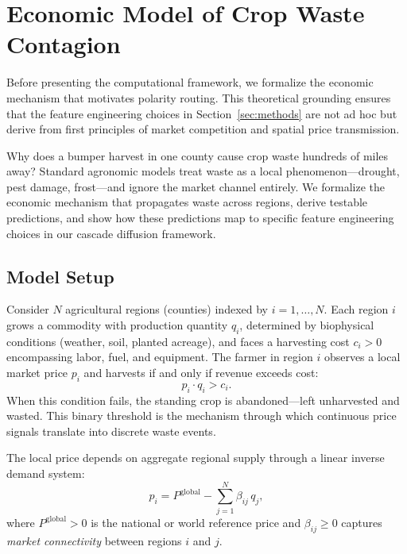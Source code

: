 \documentclass[preprint,12pt,authoryear]{elsarticle}
\begin{document}
\section{Economic Model of Crop Waste Contagion}
\label{sec:economic_model}

Before presenting the computational framework, we formalize the economic mechanism that motivates polarity routing. This theoretical grounding ensures that the feature engineering choices in Section~\ref{sec:methods} are not ad hoc but derive from first principles of market competition and spatial price transmission.

Why does a bumper harvest in one county cause crop waste hundreds of miles away?
Standard agronomic models treat waste as a local phenomenon---drought, pest damage, frost---and ignore the market channel entirely.
We formalize the economic mechanism that propagates waste across regions, derive testable predictions, and show how these predictions map to specific feature engineering choices in our cascade diffusion framework.

\subsection{Model Setup}
\label{sec:model_setup}

Consider $N$ agricultural regions (counties) indexed by $i = 1, \ldots, N$.
Each region $i$ grows a commodity with production quantity $q_i$, determined by biophysical conditions (weather, soil, planted acreage), and faces a harvesting cost $c_i > 0$ encompassing labor, fuel, and equipment.
The farmer in region $i$ observes a local market price $p_i$ and harvests if and only if revenue exceeds cost:
\begin{equation}
\label{eq:harvest_condition}
p_i \cdot q_i > c_i.
\end{equation}
When this condition fails, the standing crop is abandoned---left unharvested and wasted. This binary threshold is the mechanism through which continuous price signals translate into discrete waste events.

The local price depends on aggregate regional supply through a linear inverse demand system:
\begin{equation}
\label{eq:price}
p_i = P^{\mathrm{global}} - \sum_{j=1}^{N} \beta_{ij} \, q_j,
\end{equation}
where $P^{\mathrm{global}} > 0$ is the national or world reference price and $\beta_{ij} \geq 0$ captures \emph{market connectivity} between regions $i$ and $j$.
\end{document}
